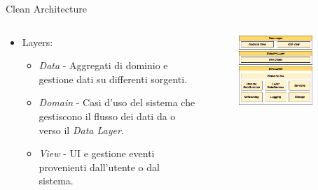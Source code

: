     \begin{frame}{Clean Architecture}
        \begin{columns}[onlytextwidth]
            \begin{column}{0.45\textwidth}
            \begin{itemize}
                \item Layers:
                    \begin{itemize}
                        \item \textit{Data} - Aggregati di dominio e gestione dati su differenti sorgenti.
                        \item \textit{Domain} - Casi d’uso del sistema che gestiscono il flusso dei dati da o verso il \textit{Data Layer}.
                        \item \textit{View} - UI e gestione eventi provenienti dall’utente o dal sistema.
                    \end{itemize}
                \end{itemize}
            \end{column}
            \begin{column}{0.55\textwidth}
                \begin{figure}[H]
                \centering
                \includegraphics[width=0.8\textwidth]{img/tesi-2-Page-18.drawio.png}
                \end{figure}
            \end{column}
        \end{columns}
    \end{frame}

